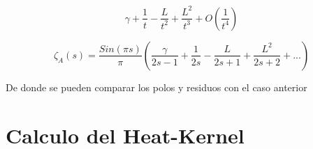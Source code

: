 \begin{equation}
    \gamma + \frac{1}{t}-\frac{L}{t^2}+\frac{L^2}{t^3}+O(\frac{1}{t^4})
\label{eq:chi}
\end{equation}

\begin{equation}
    \zeta _A (s) = 
    \frac{Sin(\pi s)}{\pi}
    \left(
    \frac{\gamma}{2s-1} + 
    \frac{1}{2s} -
    \frac{L}{2s+1} +
    \frac{L^2}{2s+2} + ...
    \right)
\label{eq.zeta.com}
\end{equation}

De donde se pueden comparar los polos y residuos con el caso anterior 

\section{Calculo del Heat-Kernel}
